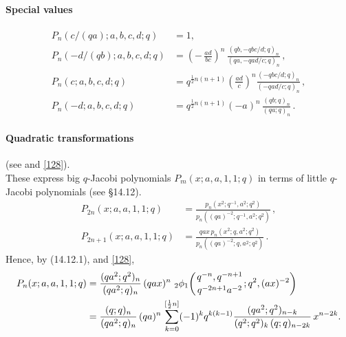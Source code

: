 \documentclass[twoside,11pt]{article}
\newcommand\half{\frac12}
\newcommand{\qhyp}[5]{\,\mbox{}_{#1}\phi_{#2}\!\left(
  \genfrac{}{}{0pt}{}{#3}{#4};#5\right)}
\begin{document}
\paragraph{Special values}
\begin{align}
P_n(c/(qa);a,b,c,d;q)&=1,\\
P_n(-d/(qb);a,b,c,d;q)&=\left(-\,\frac{ad}{bc}\right)^n\,
\frac{(qb,-qbc/d;q)_n}{(qa,-qad/c;q)_n}\,,\\
P_n(c;a,b,c,d;q)&=
q^{\half n(n+1)}\left(\frac{ad}c\right)^n
\frac{(-qbc/d;q)_n}{(-qad/c;q)_n}\,,\\
P_n(-d;a,b,c,d;q)&=q^{\half n(n+1)} (-a)^n\,\frac{(qb;q)_n}{(qa;q)_n}\,.
\end{align}
%
\paragraph{Quadratic transformations}
(see \cite[(2.48), (2.49)]{K17} and \eqref{128}).\\
These express big $q$-Jacobi polynomials $P_m(x;a,a,1,1;q)$ in terms of little
$q$-Jacobi polynomials (see \S14.12).
\begin{align}
P_{2n}(x;a,a,1,1;q)&=\frac{p_n(x^2;q^{-1},a^2;q^2)}{p_n((qa)^{-2};q^{-1},a^2;q^2)}\,,
\label{130}\\
P_{2n+1}(x;a,a,1,1;q)&=\frac{qax\,p_n(x^2;q,a^2;q^2)}{p_n((qa)^{-2};q,a^2;q^2)}\,.
\label{131}
\end{align}
Hence, by (14.12.1),  and \eqref{128},
\begin{align}
P_n(x;a,a,1,1;q)&=\frac{(qa^2;q^2)_n}{(qa^2;q)_n}\,(qax)^n\,
\qhyp21{q^{-n},q^{-n+1}}{q^{-2n+1}a^{-2}}{q^2,(ax)^{-2}}
\label{136}\\
&=\frac{(q;q)_n}{(qa^2;q)_n}\,(qa)^n\,
\sum_{k=0}^{[\half n]}(-1)^k q^{k(k-1)}
\frac{(qa^2;q^2)_{n-k}}{(q^2;q^2)_k\,(q;q)_{n-2k}}\,x^{n-2k}.
\label{137}
\end{align}
%
\end{document}
